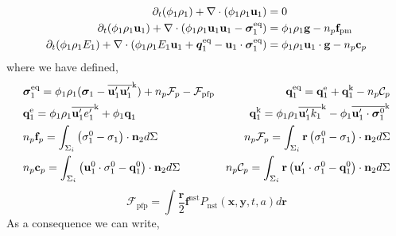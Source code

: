\begin{align}
  \partial_t (\phi_1 \rho_1)  
  + \mathbf{\nabla}\cdot (
      \phi_1 \rho_1\textbf{u}_1
  )
  &= 
  0\\
  \partial_t (\phi_1 \rho_1\textbf{u}_1)  
  + \mathbf{\nabla}\cdot (
      \phi_1 \rho_1\textbf{u}_1\textbf{u}_1
      - \bm{\sigma}_1^\text{eq}
  )
  &= 
  \phi_1 \rho_1 \textbf{g} 
  -  n_p \textbf{f}_\text{pm}\\
  \partial_t (\phi_1\rho_1E_1)  
  + \mathbf{\nabla}\cdot (
      \phi_1\rho_1E_1\textbf{u}_1
      + \bm{q}_1^\text{eq}
      - \textbf{u}_1 \cdot \bm{\sigma}_1^\text{eq}
      )
  &= 
  \phi_1 \rho_1\textbf{u}_1 \cdot \textbf{g} 
  - n_p \textbf{c}_p
\end{align} 
where we have defined, 
\begin{align*}
  &\bm{\sigma}_1^\text{eq}
  = \phi_1\rho_1 (
      \bm{\sigma}_1%
      - \kavg{\textbf{u}_1'\textbf{u}_1'})
      +n_p \mathcal{F}_p
      - \mathcal{F}_\text{pfp}  
  &\textbf{q}_1^\text{eq}
  =\textbf{q}_1^\text{e} 
  +\textbf{q}_1^\text{k}  
  - n_p \mathcal{C}_p\\
  &\textbf{q}_1^\text{e}
  = \phi_1\rho_1 \kavg{\textbf{u}_1' e_1'} 
  + \phi_1\textbf{q}_1 
  &\textbf{q}_1^\text{k}
  = \phi_1\rho_1 \kavg{\textbf{u}_1' k_1} 
  - \phi_1\kavg{\textbf{u}_1' \cdot \bm{\sigma}_1^0} \\
  &n_p \textbf{f}_p= 
  \int_{\Sigma_i}
  \left(
      \mathbf{\sigma}_1^0 
      - \mathbf{\sigma}_1
  \right)  
  \cdot \textbf{n}_2d\Sigma
  &n_p \mathcal{F}_p
  = 
  \int_{\Sigma_i}
  \textbf{r}
  \left(
      \mathbf{\sigma}_1^0 
      - \mathbf{\sigma}_1
  \right)  
  \cdot \textbf{n}_2d\Sigma\\
  &n_p \textbf{c}_p= 
  \int_{\Sigma_i}
  \left(
      \textbf{u}_1^0 \cdot \mathbf{\sigma}_1^0 
      - \textbf{q}_1^0 
  \right)  
  \cdot \textbf{n}_2d\Sigma
  &n_p \mathcal{C}_p
  = 
  \int_{\Sigma_i}
  \textbf{r}
  \left(
      \textbf{u}_1' \cdot \mathbf{\sigma}_1^0 
      - \textbf{q}_1^0 
  \right)  
  \cdot \textbf{n}_2d\Sigma\\
\end{align*}
\begin{equation*}
  \mathcal{F}_\text{pfp}
  = \int 
  \frac{\textbf{r}}{2}
  \textbf{f}^\text{nst} 
  P_\text{nst}(\textbf{x},\textbf{y},t,a)
  d\textbf{r}
\end{equation*}
As a consequence we can write, 

